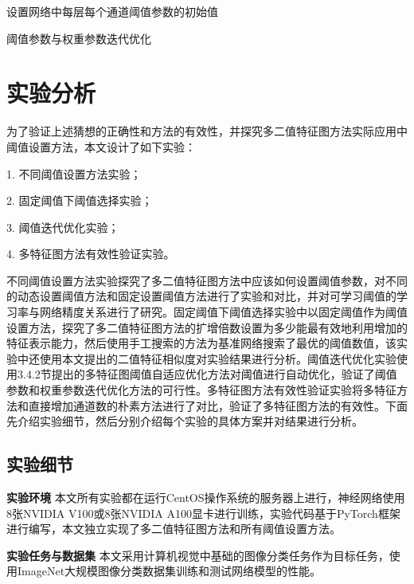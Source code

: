 \vspace{6pt}
\begin{algorithm}[htb]
  \SetAlgoLined

  设置网络中每层每个通道阈值参数的初始值\;
  \caption{阈值参数与权重参数迭代优化}
  \label{algo:bilevel}
\end{algorithm}

\section{实验分析}

为了验证上述猜想的正确性和方法的有效性，并探究多二值特征图方法实际应用中阈值设置方法，本文设计了如下实验：

1. 不同阈值设置方法实验；

2. 固定阈值下阈值选择实验；

3. 阈值迭代优化实验；

4. 多特征图方法有效性验证实验。

不同阈值设置方法实验探究了多二值特征图方法中应该如何设置阈值参数，对不同的动态设置阈值方法和固定设置阈值方法进行了实验和对比，并对可学习阈值的学习率与网络精度关系进行了研究。固定阈值下阈值选择实验中以固定阈值作为阈值设置方法，探究了多二值特征图方法的扩增倍数设置为多少能最有效地利用增加的特征表示能力，然后使用手工搜索的方法为基准网络搜索了最优的阈值数值，该实验中还使用本文提出的二值特征相似度对实验结果进行分析。阈值迭代优化实验使用3.4.2节提出的多特征图阈值自适应优化方法对阈值进行自动优化，验证了阈值参数和权重参数迭代优化方法的可行性。多特征图方法有效性验证实验将多特征方法和直接增加通道数的朴素方法进行了对比，验证了多特征图方法的有效性。下面先介绍实验细节，然后分别介绍每个实验的具体方案并对结果进行分析。

\subsection{实验细节}

\textbf{实验环境} \quad 本文所有实验都在运行CentOS操作系统的服务器上进行，神经网络使用8张NVIDIA V100或8张NVIDIA A100显卡进行训练，实验代码基于PyTorch框架进行编写，本文独立实现了多二值特征图方法和所有阈值设置方法。

\textbf{实验任务与数据集} \quad 本文采用计算机视觉中基础的图像分类任务作为目标任务，使用ImageNet大规模图像分类数据集训练和测试网络模型的性能。

